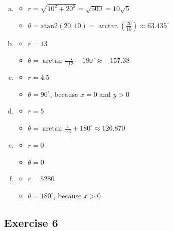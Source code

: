 \documentclass[11pt]{article}
\begin{document}
\begin{enumerate}[a.]
	\item %
		\begin{itemize}
			\item $r=\sqrt{10^2+20^2}=\sqrt{500}=10\sqrt{5}$
			\item $\theta=\text{atan2}(20,10)=\arctan(\frac{20}{10}) \approx 63.435^\circ$
		\end{itemize}
	\item %
		\begin{itemize}
			\item $r=13$
			\item $\theta=\arctan\frac{-5}{-12}-180^\circ \approx -157.38^\circ$
		\end{itemize}
	\item %
		\begin{itemize}
			\item $r=4.5$
			\item $\theta=90^\circ$, because $x=0$ and $y>0$
		\end{itemize}
	\item %
		\begin{itemize}
			\item $r=5$
			\item $\theta=\arctan\frac{4}{-3}+180^\circ \approx 126.870$
		\end{itemize}
	\item %
		\begin{itemize}
			\item $r=0$
			\item $\theta=0$
		\end{itemize}
	\item %
		\begin{itemize}
			\item $r=5280$
			\item $\theta=180^\circ$, because $x>0$
		\end{itemize}
\end{enumerate}


\subsection{Exercise 6}
\end{document}

